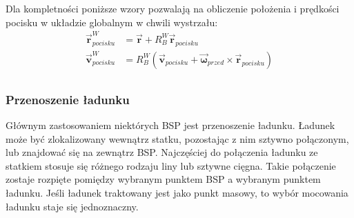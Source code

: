 Dla kompletności poniższe wzory pozwalają na obliczenie położenia i prędkości pocisku w układzie globalnym w chwili wystrzału:
\[
	\begin{aligned}
	\vec{\bm{r}}_{pocisku}^W & = \vec{\bm{r}} + R_B^W \vec{\bm{r}}_{pocisku}\\
	\vec{\bm{v}}_{pocisku}^W & =  R_B^W \left( \vec{\bm{v}}_{pocisku} + \vec{\bm{\omega}}_{przed} \times \vec{\bm{r}}_{pocisku} \right)\\
	\end{aligned}
\]



\subsubsection{Przenoszenie ładunku}

Głównym zastosowaniem niektórych BSP jest przenoszenie ładunku. Ładunek może być zlokalizowany wewnątrz statku, pozostając z nim sztywno połączonym, lub znajdować się na zewnątrz BSP. Najczęściej do połączenia ładunku ze statkiem stosuje się różnego rodzaju liny lub sztywne cięgna. Takie połączenie zostaje rozpięte pomiędzy wybranym punktem BSP a wybranym punktem ładunku. Jeśli ładunek traktowany jest jako punkt masowy, to wybór mocowania ładunku staje się jednoznaczny.\\

